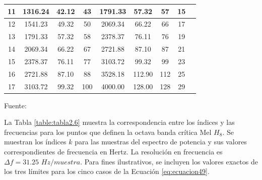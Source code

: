 \begin{enumerate}
\begin{enumerate}
\begin{center}
\begin{table}[h]
{\begin{tabular}{|c|c|c|c|c|c|c|c|c|}
{\small 11} & {\small 1316.24} & {\small 42.12} & {\small 43} & {\small 1791.33} & {\small 57.32} & {\small 57} & {\small 15}  \\ \hline 
{\small 12} & {\small 1541.23} & {\small 49.32} & {\small 50} & {\small 2069.34} & {\small 66.22} & {\small 66} & {\small 17}  \\ \hline 
{\small 13} & {\small 1791.33} & {\small 57.32} & {\small 58} & {\small 2378.37} & {\small 76.11} & {\small 76} & {\small 19}  \\ \hline 
{\small 14} & {\small 2069.34} & {\small 66.22} & {\small 67} & {\small 2721.88} & {\small 87.10} & {\small 87} & {\small 21}  \\ \hline 
{\small 15} & {\small 2378.37} & {\small 76.11} & {\small 77} & {\small 3103.72} & {\small 99.32} & {\small 99} & {\small 23}  \\ \hline 
{\small 16} & {\small 2721.88} & {\small 87.10} & {\small 88} & {\small 3528.18} & {\small 112.90} & {\small 112} & {\small 25}  \\ \hline 
{\small 17} & {\small 3103.72} & {\small 99.32} & {\small 100} & {\small 4000.00} & {\small 128.00} & {\small 128} & {\small 29}  \\ 
\hline 
\end{tabular} 
}
\begin{center}
\vskip 0.2cm
{\small{Fuente: \cite{eyra}}}
\end{center}
\end{table}
\end{center}

La Tabla \ref{table:tabla2.6} muestra la correspondencia entre los índices y las frecuencias para los puntos que definen la octava banda crítica Mel $H_{8}$. Se muestran los índices $k$ para las muestras del espectro de potencia y sus valores correspondientes de frecuencia en Hertz. La resolución en frecuencia es $\Delta f = 31.25$ $Hz/muestra$. Para fines ilustrativos, se incluyen los valores exactos de los tres límites para los cinco casos de la Ecuación \eqref{eq:ecuacion49}.


\end{enumerate}
\end{enumerate}
